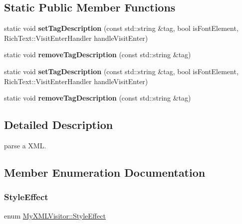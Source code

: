 \subsection*{Static Public Member Functions}
\begin{DoxyCompactItemize}
\item 
\mbox{\label{classMyXMLVisitor_ad3d8fa96f43f704dbad7d725bd254aac}} 
static void {\bfseries set\+Tag\+Description} (const std\+::string \&tag, bool is\+Font\+Element, Rich\+Text\+::\+Visit\+Enter\+Handler handle\+Visit\+Enter)
\item 
\mbox{\label{classMyXMLVisitor_ad37329dd3b5d83895638038c911ecd02}} 
static void {\bfseries remove\+Tag\+Description} (const std\+::string \&tag)
\item 
\mbox{\label{classMyXMLVisitor_a6ffc8855d5a4dcdd9d7360d7dbc5c302}} 
static void {\bfseries set\+Tag\+Description} (const std\+::string \&tag, bool is\+Font\+Element, Rich\+Text\+::\+Visit\+Enter\+Handler handle\+Visit\+Enter)
\item 
\mbox{\label{classMyXMLVisitor_a4e8ef95981219fa156dd09c7d1372a90}} 
static void {\bfseries remove\+Tag\+Description} (const std\+::string \&tag)
\end{DoxyCompactItemize}


\subsection{Detailed Description}
parse a X\+ML. 

\subsection{Member Enumeration Documentation}
\mbox{\label{classMyXMLVisitor_a7f84d816c0b481e9cb35884996af6c2c}} 
\subsubsection{\texorpdfstring{Style\+Effect}{StyleEffect}\hspace{0.1cm}{\footnotesize\ttfamily [1/2]}}
{\footnotesize\ttfamily enum \hyperlink{classMyXMLVisitor_a7f84d816c0b481e9cb35884996af6c2c}{My\+X\+M\+L\+Visitor\+::\+Style\+Effect}\hspace{0.3cm}{\ttfamily [strong]}}




